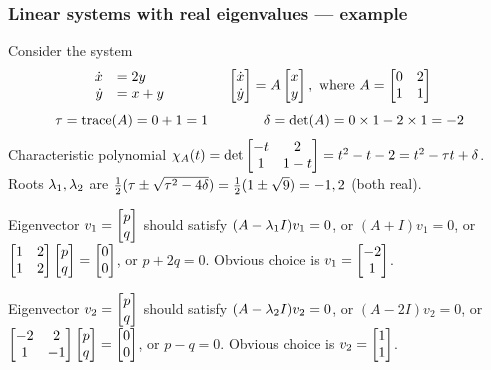 \documentclass[9pt]{beamer}
\begin{document}
\begin{frame}[t]
 \frametitle{Linear systems with real eigenvalues --- example}
 
 Consider the system
 \[ \begin{array}{rl}
     \dot{x} &= 2y \\ \dot{y} &= x + y
    \end{array}
    \hspace{4em}
    \left[\begin{matrix} \dot{x} \\ \dot{y} \end{matrix}\right] = 
    A\left[\begin{matrix} x \\ y \end{matrix}\right], \text{ where }
    A = \left[\begin{matrix} 0 & 2 \\ 1 & 1 \end{matrix}\right]
 \]\pause 
 \[ \tau = \text{trace}(A) = 0+1 = 1 \hspace{4em}
    \delta = \det(A) = 0\times 1 - 2\times 1 = -2
 \]\pause 
 Characteristic polynomial 
 $\chi_A(t)=\det\left[\begin{matrix} -t & 2 \\ 1 & 1-t \end{matrix}\right] = 
  t^2 - t - 2 = t^2 - \tau t + \delta
 $.\\ \pause
 Roots $\lambda_1,\lambda_2$ are
 $\tfrac{1}{2}(\tau\pm\sqrt{\tau^2-4\delta})=\tfrac{1}{2}(1\pm\sqrt{9})=-1,2$
 (both real).\\ \pause

 \medskip

 Eigenvector $v_1=\left[\begin{matrix} p\\ q\end{matrix}\right]$ should satisfy 
 $(A-\lambda_1I)v_1=0$, or $(A+I)v_1=0$, or
 $\left[\begin{matrix} 1&2\\1&2\end{matrix}\right]\left[\begin{matrix} p\\ q\end{matrix}\right]=\left[\begin{matrix} 0\\ 0\end{matrix}\right]$,
 or $p+2q=0$.  \pause Obvious choice is $v_1=\left[\begin{matrix} -2\\ 1\end{matrix}\right]$.\\ \pause

 \medskip

 Eigenvector $v_2=\left[\begin{matrix} p\\ q\end{matrix}\right]$ should satisfy 
 $(A-\lambda_2I)v_2=0$, or $(A-2I)v_2=0$, or
 $\left[\begin{matrix} -2&2\\1&-1\end{matrix}\right]\left[\begin{matrix} p\\ q\end{matrix}\right]=\left[\begin{matrix} 0\\ 0\end{matrix}\right]$,
 or $p-q=0$.  \pause Obvious choice is $v_2=\left[\begin{matrix} 1\\ 1\end{matrix}\right]$.

\end{frame}
\end{document}
